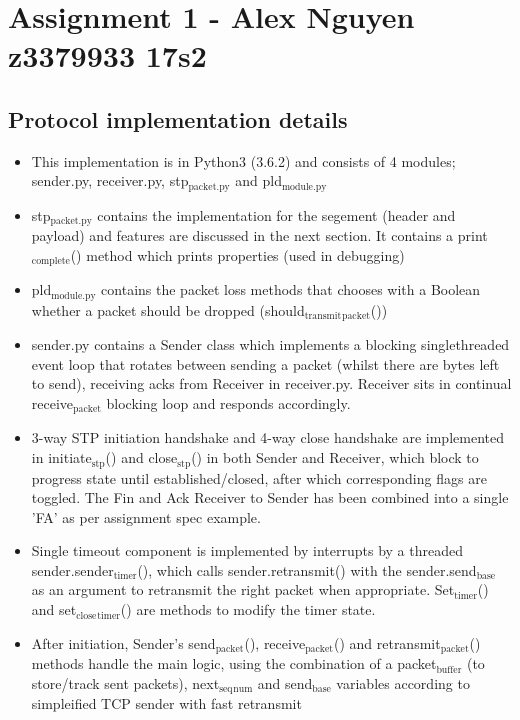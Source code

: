 \documentclass[11pt]{article}
\author{alex}
\date{\today}
\title{}
\begin{document}
\tableofcontents

\section{Assignment 1 - Alex Nguyen z3379933 17s2}
\label{sec:orgce30c36}
\subsection{Protocol implementation details}
\label{sec:org19af96c}
\begin{itemize}
\item This implementation is in Python3 (3.6.2) and consists of 4 modules; sender.py, receiver.py, stp\(_{\text{packet.py}}\) and pld\(_{\text{module.py}}\)
\item stp\(_{\text{packet.py}}\) contains the implementation for the segement (header and payload) and features are discussed in the next section. It contains a print\(_{\text{complete}}\)() method which prints properties (used in debugging)
\item pld\(_{\text{module.py}}\) contains the packet loss methods that chooses with a Boolean whether a packet should be dropped (should\(_{\text{transmit}}\)\(_{\text{packet}}\)())
\item sender.py contains a Sender class which implements a blocking singlethreaded event loop that rotates between sending a packet (whilst there are bytes left to send), receiving acks from Receiver in receiver.py. Receiver sits in continual receive\(_{\text{packet}}\) blocking loop and responds accordingly.
\item 3-way STP initiation handshake and 4-way close handshake are implemented in initiate\(_{\text{stp}}\)() and close\(_{\text{stp}}\)() in both Sender and Receiver, which block to progress state until established/closed, after which corresponding flags are toggled. The Fin and Ack Receiver to Sender has been combined into a single 'FA' as per assignment spec example.
\item Single timeout component is implemented by interrupts by a threaded sender.sender\(_{\text{timer}}\)(), which calls sender.retransmit() with the sender.send\(_{\text{base}}\) as an argument to retransmit the right packet when appropriate. Set\(_{\text{timer}}\)() and set\(_{\text{close}}\)\(_{\text{timer}}\)() are methods to modify the timer state.
\item After initiation, Sender's send\(_{\text{packet}}\)(), receive\(_{\text{packet}}\)() and retransmit\(_{\text{packet}}\)() methods handle the main logic, using the combination of a packet\(_{\text{buffer}}\) (to store/track sent packets), next\(_{\text{seq}}\)\(_{\text{num}}\) and send\(_{\text{base}}\) variables according to simpleified TCP sender with fast retransmit

\end{itemize}
\end{document}
